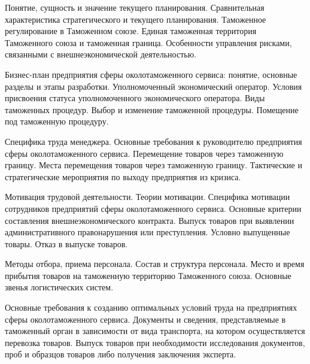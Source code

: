 \documentclass[
	11pt,
	a4paper,
	]
	{article}
\begin{document}
\bigskip

\noindent{} 
	{
		Понятие, сущность и значение текущего планирования. Сравнительная характеристика стратегического и текущего планирования.
	}{
		Таможенное регулирование в Таможенном союзе. Единая таможенная территория Таможенного союза и таможенная граница.
	}{
		Особенности управления рисками, связанными с внешнеэкономической деятельностью.
	}

\bigskip

\noindent{} 
	{
		Бизнес-план предприятия сферы околотаможенного сервиса: понятие, основные разделы и этапы разработки.
	}{
		Уполномоченный экономический оператор. Условия присвоения статуса уполномоченного экономического оператора.
	}{
		Виды таможенных процедур. Выбор и изменение таможенной процедуры. Помещение под таможенную процедуру.
	}

\bigskip

\noindent{} 
	{
		Специфика труда менеджера. Основные требования к руководителю предприятия сферы околотаможенного сервиса.
	}{
		Перемещение товаров через таможенную границу. Места перемещения товаров через таможенную границу.
	}{
		Тактические и стратегические мероприятия по выходу предприятия из кризиса.
	}

\bigskip

\noindent{} 
	{
		Мотивация трудовой деятельности. Теории мотивации. Специфика мотивации сотрудников предприятий сферы околотаможенного сервиса.
	}{
		Основные критерии составления внешнеэкономического контракта.
	}{
		Выпуск товаров при выявлении административного правонарушения или преступления. Условно выпущенные товары. Отказ в выпуске товаров.
	}

\bigskip

\noindent{} 
	{
		Методы отбора, приема персонала. Состав и структура персонала.
	}{
		Место и время прибытия товаров на таможенную территорию Таможенного союза.
	}{
		Основные звенья логистических систем.
	}

\bigskip

\noindent{} 
	{
		Основные требования к созданию оптимальных условий труда на предприятиях сферы околотаможенного сервиса.
	}{
		Документы и сведения, представляемые в таможенный орган в зависимости от вида транспорта, на котором осуществляется перевозка товаров.
	}{
		Выпуск товаров при необходимости исследования документов, проб и образцов товаров либо получения заключения эксперта.
	}

\bigskip
\end{document}
